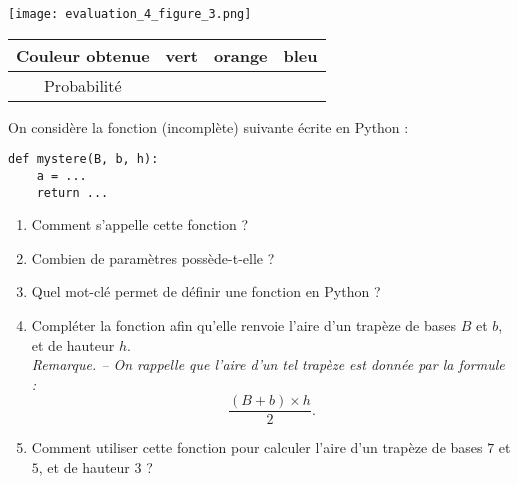 \documentclass[a4paper,dvipsnames]{article}
\begin{document}
\begin{multicols}{2}
  \begin{center}
    \texttt{[image: evaluation\_4\_figure\_3.png]}
  \end{center}

  \begin{center}
    \vspace*{0.75cm}
    \hspace*{-3cm}\begin{tabular}{@{}cccc@{}}
      \toprule
      Couleur obtenue & vert & orange & bleu\\
      \midrule
      Probabilité & & & \vphantom{$\dfrac{1}{4}$}\\
      \bottomrule
    \end{tabular}
  \end{center}
\end{multicols}

\bigskip

\exo On considère la fonction (incomplète) suivante écrite en Python :

\begin{verbatim}
def mystere(B, b, h):
    a = ...
    return ...
\end{verbatim}

\begin{enumerate}
  \item Comment s'appelle cette fonction ?
  \item Combien de paramètres possède-t-elle ?
  \item Quel mot-clé permet de définir une fonction en Python ?
  \item Compléter la fonction afin qu'elle renvoie l'aire d'un trapèze de bases $B$ et $b$, et de hauteur $h$.\\
    \textit{Remarque. -- On rappelle que l'aire d'un tel trapèze est donnée par la formule :
      \[\dfrac{(B + b)\times h}{2}.\]
  }
\item Comment utiliser cette fonction pour calculer l'aire d'un trapèze de bases $7$ et $5$, et de hauteur $3$ ?
\end{enumerate}
\end{document}
